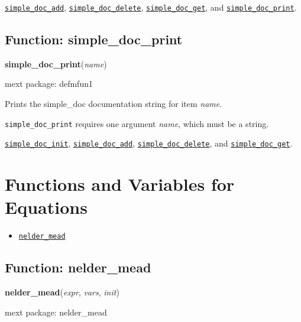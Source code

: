 \documentclass[]{article}
\begin{document}
  \hyperlink{simple_doc_add}{{\tt simple\_doc\_add}}, \hyperlink{simple_doc_delete}{{\tt simple\_doc\_delete}}, \hyperlink{simple_doc_get}{{\tt simple\_doc\_get}}, and \hyperlink{simple_doc_print}{{\tt simple\_doc\_print}}.

\vspace{5 pt}


\subsection{Function: simple\_doc\_print\label{sec:simple_doc_print}}
\hypertarget{simple_doc_print}{}
{\bf simple\_doc\_print}({\it name})


\noindent mext package: defmfun1



\vspace{5 pt}
Prints the simple\_doc documentation string for item {\it name}. 

\vspace{5 pt}

   {\tt simple\_doc\_print} requires one argument {\it name}, which must be a string.


\vspace{5 pt}


  \hyperlink{simple_doc_init}{{\tt simple\_doc\_init}}, \hyperlink{simple_doc_add}{{\tt simple\_doc\_add}}, \hyperlink{simple_doc_delete}{{\tt simple\_doc\_delete}}, and \hyperlink{simple_doc_get}{{\tt simple\_doc\_get}}.

\vspace{5 pt}


\section{Functions and Variables for Equations}
\begin{itemize}
\item \hyperlink{nelder_mead}{{\tt nelder\_mead}}
\end{itemize}
\subsection{Function: nelder\_mead\label{sec:nelder_mead}}
\hypertarget{nelder_mead}{}
{\bf nelder\_mead}({\it expr}, {\it vars}, {\it init})


\noindent mext package: nelder\_mead
\end{document}

